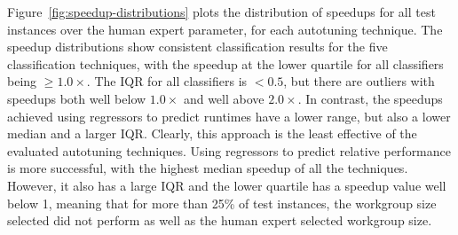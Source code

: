 \documentclass[nonatbib,preprint,10pt]{sigplanconf}
\begin{document}
Figure~\ref{fig:speedup-distributions} plots the distribution of
speedups for all test instances over the human expert parameter, for
each autotuning technique. The speedup distributions show consistent
classification results for the five classification techniques, with
the speedup at the lower quartile for all classifiers being
$\ge 1.0\times$. The IQR for all classifiers is $< 0.5$, but there are
outliers with speedups both well below $1.0\times$ and well above
$2.0\times$. In contrast, the speedups achieved using regressors to
predict runtimes have a lower range, but also a lower median and a
larger IQR. Clearly, this approach is the least effective of the
evaluated autotuning techniques. Using regressors to predict relative
performance is more successful, with the highest median speedup of all
the techniques. However, it also has a large IQR and the lower
quartile has a speedup value well below 1, meaning that for more than
25\% of test instances, the workgroup size selected did not perform as
well as the human expert selected workgroup size.
\end{document}
